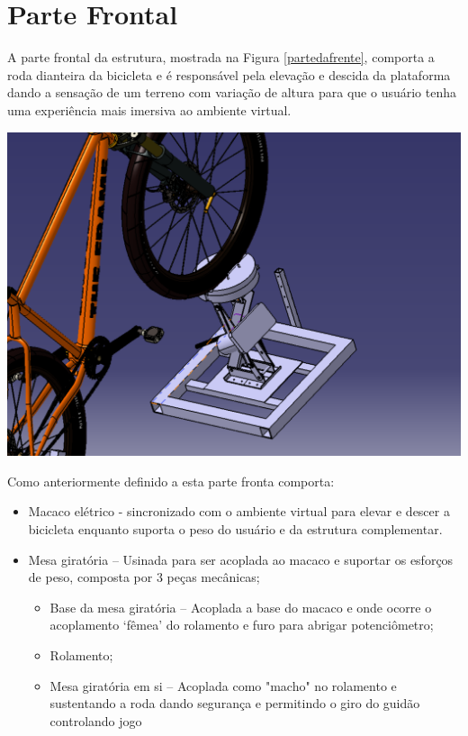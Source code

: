 \section{Parte Frontal} 

A parte frontal da estrutura, mostrada na Figura \ref{partedafrente}, comporta a roda dianteira da bicicleta e é responsável pela elevação e descida da plataforma dando a sensação de um terreno com variação de altura para que o usuário tenha uma experiência mais imersiva ao ambiente virtual.

    \begin{center}
        \includegraphics[scale=0.4]{figuras/partedafrente.png}
        \label{partedafrente}
    \end{center}
    

    Como anteriormente definido a esta parte fronta comporta:
    \begin{itemize}
        \item Macaco elétrico - sincronizado com o ambiente virtual para elevar e descer a bicicleta enquanto suporta o peso do usuário e da estrutura complementar.

        \item Mesa giratória – Usinada para ser acoplada ao macaco e suportar os esforços de peso, composta por 3 peças mecânicas;
            \begin{itemize}
                \item Base da mesa giratória – Acoplada a base do macaco e onde ocorre o acoplamento ‘fêmea’ do rolamento e furo para abrigar potenciômetro;
                \item Rolamento;
                \item Mesa giratória em si – Acoplada como "macho" no rolamento e sustentando a roda dando segurança e permitindo o giro do guidão controlando jogo
            \end{itemize}
    \end{itemize}    


